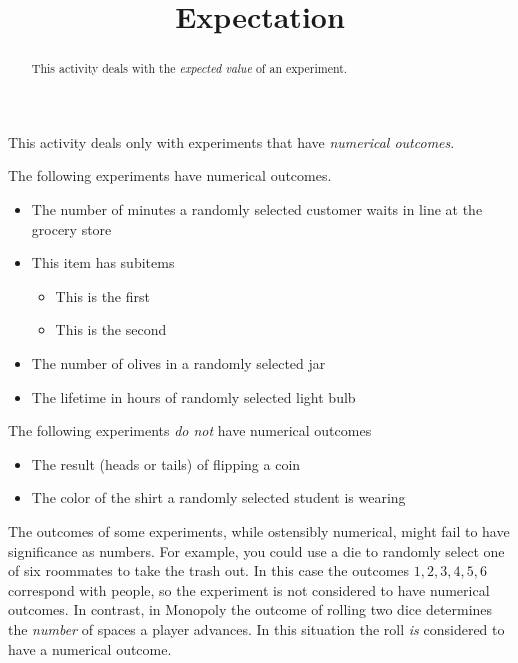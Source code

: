 \documentclass{ximera}
\title{Expectation}
\begin{document}
\begin{abstract}
This activity deals with the {\em expected value}
of an experiment.
\end{abstract}
\maketitle

This activity deals only with experiments
that have {\em numerical outcomes}.

\begin{example}
The following experiments have numerical outcomes.
\begin{itemize}
\item The number of minutes a randomly selected
customer waits in line at the grocery store
\item This item has subitems
\begin{itemize}
\item This is the first
\item This is the second
\end{itemize}
\item The number of olives in a randomly selected jar
\item The lifetime in hours of randomly selected light bulb
\end{itemize}
\end{example}

\begin{example}
The following experiments {\em do not} have numerical outcomes
\begin{itemize}
\item The result (heads or tails) of flipping a coin
\item The color of the shirt a randomly selected student is wearing
\end{itemize}
\end{example}

\begin{remark}
The outcomes of some experiments, while ostensibly numerical,
might fail to have significance as numbers.
For example, you could use a die to randomly select one of
six roommates to take the trash out.
In this case the outcomes $1,2,3,4,5,6$ correspond with people,
so the experiment is not considered to have numerical outcomes.
In contrast, in Monopoly the outcome of rolling two dice
determines the {\em number} of spaces a player advances.
In this situation the roll {\em is} considered to have a numerical outcome.
\end{remark}
\end{document}
